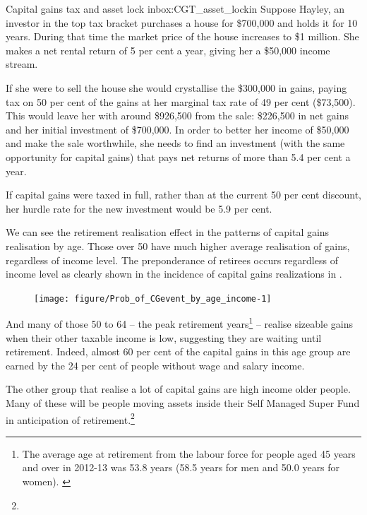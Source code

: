\documentclass{grattan}\usepackage[]{graphicx}\usepackage[]{color}
\newcommand\gao{Grattan analysis of}
\begin{document}
\begin{smallbox}{Capital gains tax and asset lock in}{box:CGT_asset_lockin}
Suppose Hayley, an investor in the top tax bracket purchases a house for \$700,000 and holds it for 10 years. During that time the market price of the house increases to \$1 million. She makes a net rental return of 5 per cent a year, giving her a \$50,000 income stream. 

If she were to sell the house she would crystallise the \$300,000 in gains, paying tax on 50 per cent of the gains at her marginal tax rate of 49 per cent (\$73,500). This would leave her with around \$926,500 from the sale: \$226,500 in net gains and her initial investment of \$700,000. In order to better her income of \$50,000 and make the sale worthwhile, she needs to find an investment (with the same opportunity for capital gains) that pays net returns of more than 5.4 per cent a year.

If capital gains were taxed in full, rather than at the current 50 per cent discount, her hurdle rate for the new investment would be 5.9 per cent. 
\end{smallbox}

We can see the retirement realisation effect in the patterns of capital gains realisation by age. Those over 50 have much higher average realisation of gains, regardless of income level. The preponderance of retirees occurs regardless of income level as clearly shown in the incidence of capital gains realizations in .


\begin{figure}[t]
\texttt{[image: figure/Prob\_of\_CGevent\_by\_age\_income-1]}
\source{\gao\ \textcite{ATO2013i}}
\end{figure}
And many of those 50 to 64 -- the peak retirement years\footnote{The average age at retirement from the labour force for people aged 45 years and over in 2012-13 was 53.8 years (58.5 years for men and 50.0 years for women). \textcite{ABS2013}} -- realise sizeable gains when their other taxable income is low, suggesting they are waiting until retirement. Indeed, almost 60 per cent of the capital gains in this age group are earned by the 24 per cent of people without wage and salary income. 

The other group that realise a lot of capital gains are high income older people. Many of these will be people moving assets inside their Self Managed Super Fund in anticipation of retirement.\footnote{}
\end{document}
